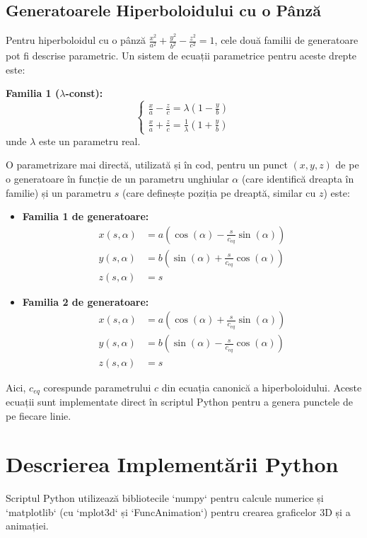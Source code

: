 \documentclass[a4paper,11pt]{article}
\begin{document}
\subsection{Generatoarele Hiperboloidului cu o Pânză}
Pentru hiperboloidul cu o pânză $\frac{x^2}{a^2} + \frac{y^2}{b^2} - \frac{z^2}{c^2} = 1$, cele două familii de generatoare pot fi descrise parametric. Un sistem de ecuații parametrice pentru aceste drepte este:

\textbf{Familia 1 ($\lambda$-const):}
\[
\begin{cases}
\frac{x}{a} - \frac{z}{c} = \lambda \left(1 - \frac{y}{b}\right) \\
\frac{x}{a} + \frac{z}{c} = \frac{1}{\lambda} \left(1 + \frac{y}{b}\right)
\end{cases}
\]
unde $\lambda$ este un parametru real.

O parametrizare mai directă, utilizată și în cod, pentru un punct $(x,y,z)$ de pe o generatoare în funcție de un parametru unghiular $\alpha$ (care identifică dreapta în familie) și un parametru $s$ (care definește poziția pe dreaptă, similar cu $z$) este:
\begin{itemize}
    \item \textbf{Familia 1 de generatoare:}
    \begin{align*}
    x(s, \alpha) &= a \left(\cos(\alpha) - \frac{s}{c_{eq}} \sin(\alpha)\right) \\
    y(s, \alpha) &= b \left(\sin(\alpha) + \frac{s}{c_{eq}} \cos(\alpha)\right) \\
    z(s, \alpha) &= s
    \end{align*}
    \item \textbf{Familia 2 de generatoare:}
    \begin{align*}
    x(s, \alpha) &= a \left(\cos(\alpha) + \frac{s}{c_{eq}} \sin(\alpha)\right) \\
    y(s, \alpha) &= b \left(\sin(\alpha) - \frac{s}{c_{eq}} \cos(\alpha)\right) \\
    z(s, \alpha) &= s
    \end{align*}
\end{itemize}
Aici, $c_{eq}$ corespunde parametrului $c$ din ecuația canonică a hiperboloidului. Aceste ecuații sunt implementate direct în scriptul Python pentru a genera punctele de pe fiecare linie.

\section{Descrierea Implementării Python}
Scriptul Python utilizează bibliotecile `numpy` pentru calcule numerice și `matplotlib` (cu `mplot3d` și `FuncAnimation`) pentru crearea graficelor 3D și a animației.
\end{document}
